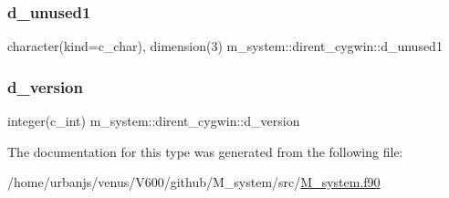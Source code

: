 \subsubsection{\texorpdfstring{d\+\_\+unused1}{d\_unused1}}
{\footnotesize\ttfamily character(kind=c\+\_\+char), dimension(3) m\+\_\+system\+::dirent\+\_\+cygwin\+::d\+\_\+unused1\hspace{0.3cm}{\ttfamily [private]}}

\mbox{\label{structm__system_1_1dirent__cygwin_a406355db287a68f3939379a9e2337484}} 
\subsubsection{\texorpdfstring{d\+\_\+version}{d\_version}}
{\footnotesize\ttfamily integer(c\+\_\+int) m\+\_\+system\+::dirent\+\_\+cygwin\+::d\+\_\+version\hspace{0.3cm}{\ttfamily [private]}}



The documentation for this type was generated from the following file\+:\begin{DoxyCompactItemize}
\item 
/home/urbanjs/venus/\+V600/github/\+M\+\_\+system/src/\mbox{\hyperlink{M__system_8f90}{M\+\_\+system.\+f90}}\end{DoxyCompactItemize}
